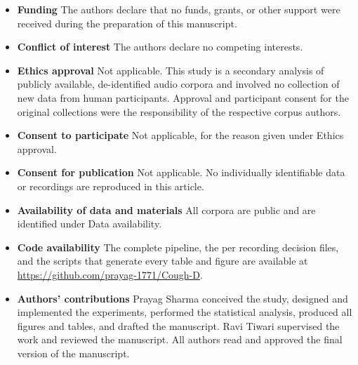 \documentclass[pdflatex,sn-mathphys-num]{sn-jnl}
\begin{document}
\begin{itemize}
\item \textbf{Funding} \; The authors declare that no funds, grants, or other support
      were received during the preparation of this manuscript.

\item \textbf{Conflict of interest} \; The authors declare no competing interests.

\item \textbf{Ethics approval} \; Not applicable. This study is a secondary analysis of
      publicly available, de-identified audio corpora and involved no collection of new
      data from human participants. Approval and participant consent for the original
      collections were the responsibility of the respective corpus authors.

\item \textbf{Consent to participate} \; Not applicable, for the reason given under
      Ethics approval.

\item \textbf{Consent for publication} \; Not applicable. No individually identifiable
      data or recordings are reproduced in this article.

\item \textbf{Availability of data and materials} \; All corpora are public and are
      identified under Data availability.

\item \textbf{Code availability} \; The complete pipeline, the per recording decision
      files, and the scripts that generate every table and figure are available at
      \url{https://github.com/prayag-1771/Cough-D}.

\item \textbf{Authors' contributions} \; Prayag Sharma conceived the study, designed and
      implemented the experiments, performed the statistical analysis, produced all
      figures and tables, and drafted the manuscript. Ravi Tiwari supervised the work and
      reviewed the manuscript. All authors read and approved the final version of the
      manuscript.
\end{itemize}
\end{document}
